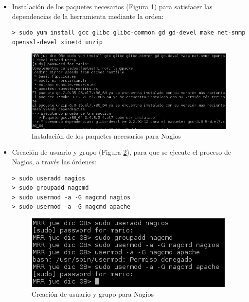 \begin{itemize}
	\item Instalación de los paquetes necesarios (Figura \ref{fig:figura121}) para satisfacer las dependencias de la herramienta mediante la orden:
\begin{lstlisting}[style=fich]
> sudo yum install gcc glibc glibc-common gd gd-devel make net-snmp openssl-devel xinetd unzip
\end{lstlisting}	
	\begin{figure}[H]
		\centering
		\includegraphics[scale=0.68]{figuras/ejercicio12/figura1.png} 
		\caption{Instalación de los paquetes necesarios para Nagios} 
		\label{fig:figura121}
	\end{figure}

	\item Creación de usuario y grupo (Figura \ref{fig:figura122}), para que se ejecute el proceso de Nagios, a través las órdenes:
\begin{lstlisting}[style=fich]
> sudo useradd nagios
> sudo groupadd nagcmd
> sudo usermod -a -G nagcmd nagios
> sudo usermod -a -G nagcmd apache
\end{lstlisting}
	
	\begin{figure}[H]
		\centering
		\includegraphics[scale=0.8]{figuras/ejercicio12/figura2.png} 
		\caption{Creación de usuario y grupo para Nagios} 
		\label{fig:figura122}
	\end{figure}
	

\end{itemize}

